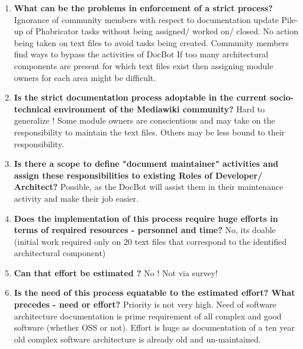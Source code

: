\begin{enumerate}
\item \textbf{What can be the problems in enforcement of a strict process?}
\newline Ignorance of community members with respect to documentation update
\newline Pile-up of Phabricator tasks without being assigned/ worked on/ closed.
\newline No action being taken on text files to avoid tasks being created.
\newline Community members find ways to bypass the activities of DocBot
\newline If too many architectural components are present for which text files exist then assigning module owners for each area might be difficult.
\item \textbf{Is the strict documentation process adoptable in the current socio-technical environment of the Mediawiki community?}
\newline Hard to generalize !
\newline Some module owners are conscientious and may take on the responsibility to maintain the text files.
\newline Others may be less bound to their responsibility.
\item \textbf{Is there a scope to define "document maintainer" activities and assign these responsibilities to existing Roles of Developer/ Architect? }
\newline Possible, as the DocBot will assist them in their maintenance activity and make their job easier.
\item \textbf{Does the implementation of this process require huge efforts in terms of required resources - personnel and time? }
\newline No, its doable (initial work required only on 20 text files that correspond to the identified architectural component)
\item \textbf{Can that effort be estimated ?}
\newline No ! Not via survey!
\item \textbf{Is the need of this process equatable to the estimated effort? What precedes - need or effort?}
\newline Priority is not very high. Need of software architecture documentation is prime requirement of all complex and good software (whether OSS or not).
\newline Effort is huge as documentation of a ten year old complex software architecture is already old and un-maintained.
\end{enumerate}
